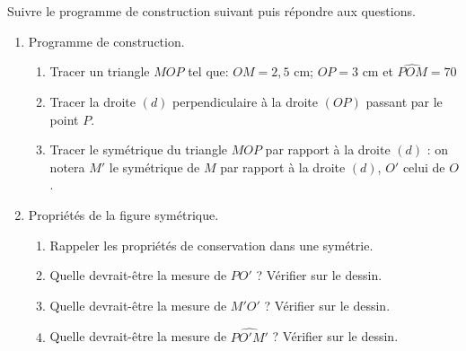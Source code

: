 \exercicesbase

\begin{colonne*exercice}


\begin{exercice} %
   Suivre le programme de construction suivant puis répondre aux questions.
   \begin{enumerate}
      \item Programme de construction.
      \begin{enumerate}
         \item Tracer un triangle $MOP$ tel que: $OM = 2,5$ cm; $OP = 3$ cm et $\widehat{POM} = 70$\degre
         \item Tracer la droite $(d)$ perpendiculaire à la droite $(OP)$ passant par le point $P$.
         \item Tracer le symétrique du triangle $MOP$ par rapport à la droite $(d)$ : on notera $M'$ le symétrique de $M$ par rapport à la droite $(d)$, $O'$ celui de $O$.
      \end{enumerate}
      \item Propriétés de la figure symétrique.
      \begin{enumerate}
         \item Rappeler les propriétés de conservation dans une symétrie.
         \item Quelle devrait-être la mesure de $PO'$ ? Vérifier sur le dessin.
         \item Quelle devrait-être la mesure de $M'O'$ ? Vérifier sur le dessin.
         \item Quelle devrait-être la mesure de $\widehat{PO'M'}$ ? Vérifier sur le dessin. \\
       \end{enumerate}
   \end{enumerate}
\end{exercice}

\bigskip


\end{colonne*exercice}
